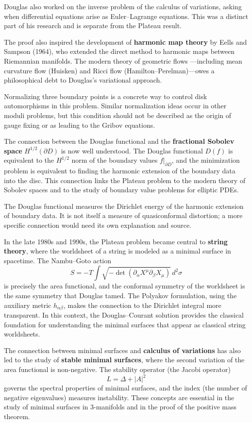 Douglas also worked on the inverse problem of the calculus of
variations, asking when differential equations arise as Euler--Lagrange
equations. This was a distinct part of his research and is separate from
the Plateau result.

The proof also inspired the development of \textbf{harmonic map theory}
by Eells and Sampson (1964), who extended the direct method to harmonic
maps between Riemannian manifolds. The modern theory of geometric flows
---including mean curvature flow (Huisken) and Ricci flow
(Hamilton--Perelman)---owes a philosophical debt to Douglas's variational
approach.

Normalizing three boundary points is a concrete way to control disk
automorphisms in this problem. Similar normalization ideas occur in
other moduli problems, but this condition should not be described as the
origin of gauge fixing or as leading to the Gribov equations.

The connection between the Douglas functional and the \textbf{fractional
Sobolev space} $H^{1/2}(\partial D)$ is now well understood. The Douglas
functional $D(f)$ is equivalent to the $H^{1/2}$ norm of the boundary
values $f|_{\partial D}$, and the minimization problem is equivalent to
finding the harmonic extension of the boundary data into the disc. This
connection links the Plateau problem to the modern theory of Sobolev
spaces and to the study of boundary value problems for elliptic PDEs.

The Douglas functional measures the Dirichlet energy of the harmonic
extension of boundary data. It is not itself a measure of
quasiconformal distortion; a more specific connection would need its
own explanation and source.

In the late 1980s and 1990s, the Plateau problem became central to
\textbf{string theory}, where the worldsheet of a string is modeled as a
minimal surface in spacetime. The Nambu--Goto action
\[
S = -T \int \sqrt{-\det(\partial_\alpha X^\mu \partial_\beta X_\mu)} \, d^2\sigma
\]
is precisely the area functional, and the conformal symmetry of the
worldsheet is the same symmetry that Douglas tamed. The Polyakov
formulation, using the auxiliary metric $h_{\alpha\beta}$, makes the
connection to the Dirichlet integral more transparent. In this context,
the Douglas--Courant solution provides the classical foundation for
understanding the minimal surfaces that appear as classical string
worldsheets.

The connection between minimal surfaces and \textbf{calculus of
variations} has also led to the study of \textbf{stable minimal
surfaces}, where the second variation of the area functional is
non-negative. The stability operator (the Jacobi operator)
\[
L = \Delta + |A|^2
\]
governs the spectral properties of minimal surfaces, and the index
(the number of negative eigenvalues) measures instability. These
concepts are essential in the study of minimal surfaces in 3-manifolds
and in the proof of the positive mass theorem.

